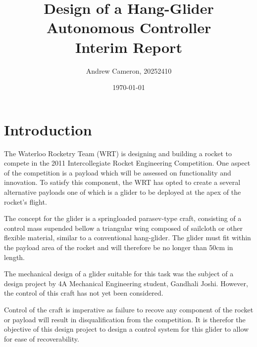 \documentclass{sydeStyle}
\title{
Design of a Hang-Glider Autonomous Controller\\
Interim Report
}
\date{\today}
\author{Andrew Cameron, 20252410}
\begin{document}
\maketitle

\section{Introduction}

The Waterloo Rocketry Team (WRT) is designing and building a rocket to compete
in the 2011 Intercollegiate Rocket Engineering Competition. One aspect of the
competition is a payload which will be assessed on functionality and
innovation.\cite{IREC} To satisfy this component, the WRT has opted to create a
several alternative payloads one of which is a glider to be deployed at the apex
of the rocket's flight.

The concept for the glider is a springloaded parasev-type craft, 
consisting of a control mass supended bellow a triangular wing composed of
sailcloth or other flexible material, similar to a conventional
hang-glider.\cite{wiki:parasev} The glider must fit within the payload area of
the rocket and will therefore be no longer than 50cm in length.

The mechanical design of a glider suitable for this task was the subject of a
design project by 4A Mechanical Engineering student, Gandhali Joshi. However,
the control of this craft has not yet been considered.

Control of the craft is imperative as failure to recove any component of
the rocket or payload will result in disqualification from the
competition.\cite{IREC} It is therefor the objective of this design project to
design a control system for this glider to allow for ease of recoverability.
\end{document}
